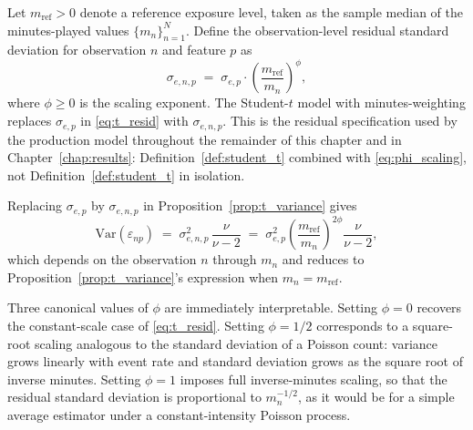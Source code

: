 \begin{definition}
\label{def:phi}
Let $m_{\mathrm{ref}} > 0$ denote a reference exposure level, taken as the sample median of the minutes-played values $\{m_n\}_{n=1}^N$. Define the observation-level residual standard deviation for observation $n$ and feature $p$ as
\begin{equation}
\sigma_{e,n,p} \;=\; \sigma_{e,p} \cdot \left(\frac{m_{\mathrm{ref}}}{m_n}\right)^{\!\phi},
\label{eq:phi_scaling}
\end{equation}
where $\phi \geq 0$ is the scaling exponent. The Student-$t$ model with minutes-weighting replaces $\sigma_{e,p}$ in \eqref{eq:t_resid} with $\sigma_{e,n,p}$. This is the residual specification used by the production model throughout the remainder of this chapter and in Chapter~\ref{chap:results}: Definition~\ref{def:student_t} combined with \eqref{eq:phi_scaling}, not Definition~\ref{def:student_t} in isolation.
\end{definition}

\begin{corollary}
\label{cor:t_variance_mv}
Replacing $\sigma_{e,p}$ by $\sigma_{e,n,p}$ in Proposition~\ref{prop:t_variance} gives
\begin{equation}
\mathrm{Var}(\varepsilon_{np}) \;=\; \sigma_{e,n,p}^2\,\frac{\nu}{\nu-2} \;=\; \sigma_{e,p}^2 \left(\frac{m_{\mathrm{ref}}}{m_n}\right)^{\!2\phi}\frac{\nu}{\nu-2},
\label{eq:t_variance_mv}
\end{equation}
which depends on the observation $n$ through $m_n$ and reduces to Proposition~\ref{prop:t_variance}'s expression when $m_n = m_{\mathrm{ref}}$.
\end{corollary}

Three canonical values of $\phi$ are immediately interpretable. Setting $\phi = 0$ recovers the constant-scale case of \eqref{eq:t_resid}. Setting $\phi = 1/2$ corresponds to a square-root scaling analogous to the standard deviation of a Poisson count: variance grows linearly with event rate and standard deviation grows as the square root of inverse minutes. Setting $\phi = 1$ imposes full inverse-minutes scaling, so that the residual standard deviation is proportional to $m_n^{-1/2}$, as it would be for a simple average estimator under a constant-intensity Poisson process.

